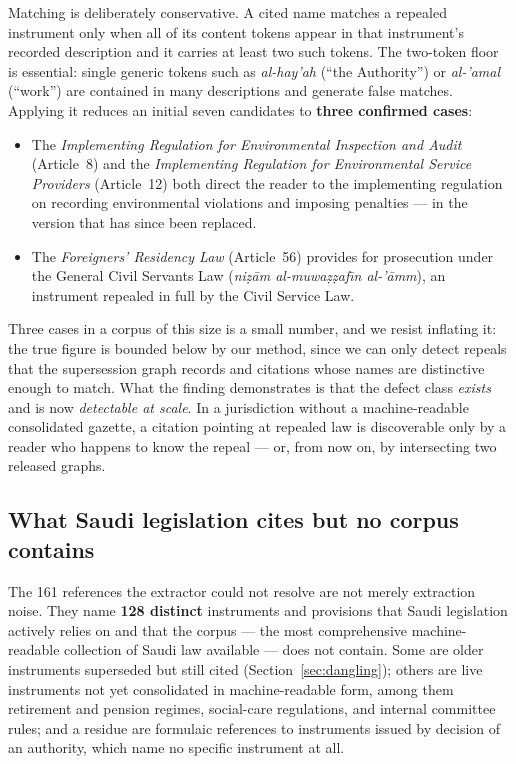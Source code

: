 \documentclass[sn-basic]{sn-jnl}%
\begin{document}
Matching is deliberately conservative. A cited name matches a repealed
instrument only when all of its content tokens appear in that instrument's
recorded description and it carries at least two such tokens. The
two-token floor is essential: single generic tokens such as
\emph{al-hay'ah} (``the Authority'') or \emph{al-'amal} (``work'') are
contained in many descriptions and generate false matches. Applying it
reduces an initial seven candidates to \textbf{three confirmed cases}:

\begin{itemize}
  \item The \emph{Implementing Regulation for Environmental Inspection and
    Audit} (Article~8) and the \emph{Implementing Regulation for
    Environmental Service Providers} (Article~12) both direct the reader to
    the implementing regulation on recording environmental violations and
    imposing penalties --- in the version that has since been replaced.
  \item The \emph{Foreigners' Residency Law} (Article~56) provides for
    prosecution under the General Civil Servants Law
    (\emph{ni\d{z}\={a}m al-muwa\d{z}\d{z}af\={\i}n al-'\={a}mm}), an
    instrument repealed in full by the Civil Service Law.
\end{itemize}

Three cases in a corpus of this size is a small number, and we resist
inflating it: the true figure is bounded below by our method, since we can
only detect repeals that the supersession graph records and citations whose
names are distinctive enough to match. What the finding demonstrates is that
the defect class \emph{exists} and is now \emph{detectable at scale}. In a
jurisdiction without a machine-readable consolidated gazette, a citation
pointing at repealed law is discoverable only by a reader who happens to
know the repeal --- or, from now on, by intersecting two released graphs.

\subsection{What Saudi legislation cites but no corpus contains}
\label{sec:absent}

The 161 references the extractor could not resolve are not merely
extraction noise. They name \textbf{128 distinct} instruments and provisions
that Saudi legislation actively relies on and that the corpus --- the most
comprehensive machine-readable collection of Saudi law available --- does not
contain. Some are older instruments superseded but still cited
(Section~\ref{sec:dangling}); others are live instruments not yet
consolidated in machine-readable form, among them retirement and pension
regimes, social-care regulations, and internal committee rules; and a
residue are formulaic references to instruments issued by decision of an
authority, which name no specific instrument at all.
\end{document}
